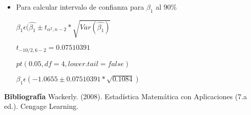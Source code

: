 \documentclass{../oxmathproblems}
\begin{document}
\begin{questions}
\begin{itemize}
\item Para calcular intervalo de confianza para $\beta_1$ al $90\%$


$ \beta_1  \epsilon  ( \hat{\beta_1} \pm t_{\alpha^2,n-2} * \sqrt{Var(\hat{\beta_1})} $  


$ t_{-10/2,6-2} = 0.07510391$ 

$pt(0.05,df = 4, lower.tail= false)$ 



$ \beta_1  \epsilon (-1.0655 \pm 0.07510391 * \sqrt{0.1084} ) $ 

\end{itemize}


\textbf{Bibliografía}
Wackerly. (2008). Estadística Matemática con Aplicaciones (7.a ed.). Cengage Learning.


\end{questions}
\end{document}
